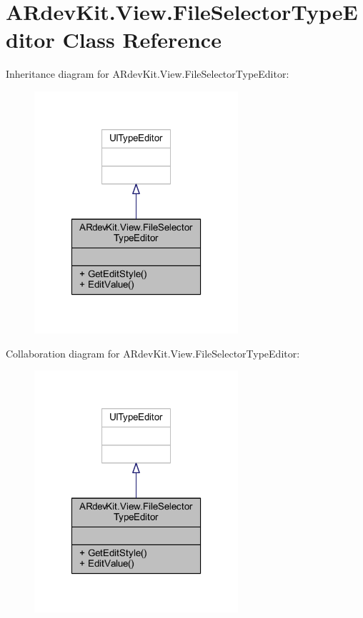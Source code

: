 \hypertarget{class_a_rdev_kit_1_1_view_1_1_file_selector_type_editor}{\section{A\-Rdev\-Kit.\-View.\-File\-Selector\-Type\-Editor Class Reference}
\label{class_a_rdev_kit_1_1_view_1_1_file_selector_type_editor}
}


Inheritance diagram for A\-Rdev\-Kit.\-View.\-File\-Selector\-Type\-Editor\-:
\nopagebreak
\begin{figure}[H]
\begin{center}
\leavevmode
\includegraphics[width=214pt]{class_a_rdev_kit_1_1_view_1_1_file_selector_type_editor__inherit__graph}
\end{center}
\end{figure}


Collaboration diagram for A\-Rdev\-Kit.\-View.\-File\-Selector\-Type\-Editor\-:
\nopagebreak
\begin{figure}[H]
\begin{center}
\leavevmode
\includegraphics[width=214pt]{class_a_rdev_kit_1_1_view_1_1_file_selector_type_editor__coll__graph}
\end{center}
\end{figure}
